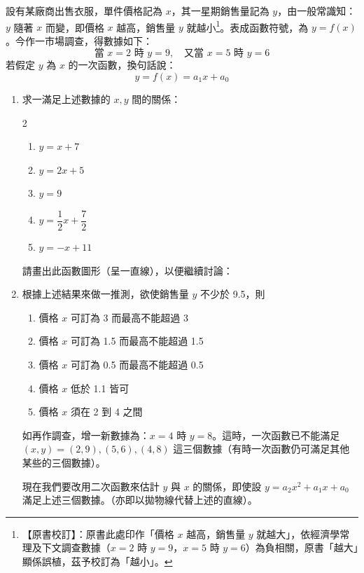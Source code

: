 \begin{discussion}[複選題]\label{ex:b6-3-1}\label{disc:b6-3-1}
設有某廠商出售衣服，單件價格記為 $x$，其一星期銷售量記為 $y$，由一般常識知：$y$ 隨著 $x$ 而變，即價格 $x$ 越高，銷售量 $y$ 就越小\label{note:b6-ch3-p124-sales}\footnote{【原書校訂】：原書此處印作「價格 $x$ 越高，銷售量 $y$ 就越大」，依經濟學常理及下文調查數據（$x=2$ 時 $y=9$，$x=5$ 時 $y=6$）為負相關，原書「越大」顯係誤植，茲予校訂為「越小」。}。表成函數符號，為 $y=f(x)$。今作一市場調查，得數據如下：
\[ \text{當 } x=2 \text{ 時 } y=9, \quad \text{又當 } x=5 \text{ 時 } y=6 \]
若假定 $y$ 為 $x$ 的一次函數，換句話說：
\[ y = f(x) = a_1 x + a_0 \]

\begin{enumerate}[label=(\Roman*), leftmargin=2.5em]
  \item 求一滿足上述數據的 $x, y$ 間的關係：
  \begin{multicols}{2}
  \begin{enumerate}[label=(\Alph*)]
    \item $y = x+7$
    \item $y = 2x+5$
    \item $y = 9$
    \item $y = \dfrac{1}{2}x + \dfrac{7}{2}$
    \item $y = -x+11$
  \end{enumerate}
  \end{multicols}
  請畫出此函數圖形（呈一直線），以便繼續討論：

  \item 根據上述結果來做一推測，欲使銷售量 $y$ 不少於 9.5，則
  \begin{enumerate}[label=(\Alph*)]
    \item 價格 $x$ 可訂為 3 而最高不能超過 3
    \item 價格 $x$ 可訂為 1.5 而最高不能超過 1.5
    \item 價格 $x$ 可訂為 0.5 而最高不能超過 0.5
    \item 價格 $x$ 低於 1.1 皆可
    \item 價格 $x$ 須在 2 到 4 之間
  \end{enumerate}

  如再作調查，增一新數據為：$x=4$ 時 $y=8$。這時，一次函數已不能滿足 $(x,y)=(2,9), (5,6), (4,8)$ 這三個數據（有時一次函數仍可滿足其他某些的三個數據）。

  現在我們要改用二次函數來估計 $y$ 與 $x$ 的關係，即使設 $y=a_2 x^2 + a_1 x + a_0$ 滿足上述三個數據。（亦即以拋物線代替上述的直線）。


\end{enumerate}
\end{discussion}
